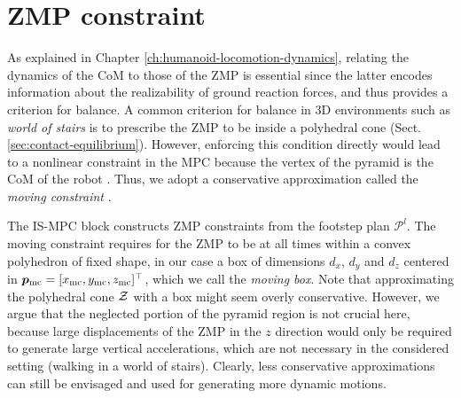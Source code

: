 \section{ZMP constraint}
As explained in Chapter \ref{ch:humanoid-locomotion-dynamics},
relating the dynamics of the CoM to those of the ZMP is essential since the
latter encodes information about the realizability of ground reaction forces,
and thus provides a criterion for balance. A common criterion for balance
in 3D environments such as \textit{world of stairs}
is to prescribe the ZMP to be inside a polyhedral cone
(Sect. \ref{sec:contact-equilibrium}). However, enforcing this condition
directly would lead to a nonlinear constraint
in the MPC because the vertex of the pyramid is the CoM of the robot
\cite{Caron2017DynamicWalkingOverRoughTerrains}.
Thus, we adopt a conservative approximation called the \textit{moving constraint}
\cite{Aboudonia2017Humanoids}.

The IS-MPC block constructs ZMP constraints from the footstep plan
$\mathcal{P}^l$. The moving constraint requires for the ZMP to be at all
times within a convex
polyhedron of fixed shape, in our case a box of dimensions $d_x$, $d_y$ and
$d_z$ centered in ${\bm{p}}_{\rm mc}=[x_{\rm mc}, y_{\rm mc}, z_{\rm mc}]^\top$,
which we call the \textit{moving box}. Note that approximating the polyhedral cone
$\cal Z$ with a box might seem overly conservative. However, we argue that the
neglected portion of the pyramid region is not crucial here, because large
displacements of the ZMP in the $z$ direction would only be required to generate
large vertical accelerations, which are not necessary in the considered setting
(walking in a world of stairs). Clearly, less conservative approximations can
still be envisaged and used for generating more dynamic motions.

